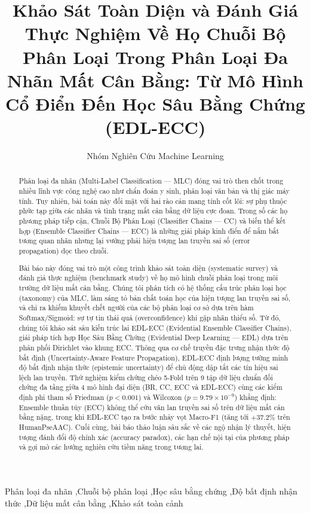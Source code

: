 \documentclass[1p,times]{elsarticle}
\begin{document}
\begin{frontmatter}

\title{Khảo Sát Toàn Diện và Đánh Giá Thực Nghiệm Về Họ Chuỗi Bộ Phân Loại Trong Phân Loại Đa Nhãn Mất Cân Bằng: Từ Mô Hình Cổ Điển Đến Học Sâu Bằng Chứng (EDL-ECC)}

\author{Nhóm Nghiên Cứu Machine Learning}
\address{Phòng Thí Nghiệm Trí Tuệ Nhân Tạo và Khoa Học Dữ Liệu}

\begin{abstract}
Phân loại đa nhãn (Multi-Label Classification — MLC) đóng vai trò then chốt trong nhiều lĩnh vực công nghệ cao như chẩn đoán y sinh, phân loại văn bản và thị giác máy tính. Tuy nhiên, bài toán này đối mặt với hai rào cản mang tính cốt lõi: sự phụ thuộc phức tạp giữa các nhãn và tình trạng mất cân bằng dữ liệu cực đoan. Trong số các họ phương pháp tiếp cận, Chuỗi Bộ Phân Loại (Classifier Chains — CC) và biến thể kết hợp (Ensemble Classifier Chains — ECC) là những giải pháp kinh điển để nắm bắt tương quan nhãn nhưng lại vướng phải hiện tượng lan truyền sai số (error propagation) dọc theo chuỗi. 

Bài báo này đóng vai trò một công trình khảo sát toàn diện (systematic survey) và đánh giá thực nghiệm (benchmark study) về họ mô hình chuỗi phân loại trong môi trường dữ liệu mất cân bằng. Chúng tôi phân tích có hệ thống cấu trúc phân loại học (taxonomy) của MLC, làm sáng tỏ bản chất toán học của hiện tượng lan truyền sai số, và chỉ ra khiếm khuyết chết người của các bộ phân loại cơ sở dựa trên hàm Softmax/Sigmoid: sự tự tin thái quá (overconfidence) khi gặp nhãn thiểu số. Từ đó, chúng tôi khảo sát sâu kiến trúc lai EDL-ECC (Evidential Ensemble Classifier Chains), giải pháp tích hợp Học Sâu Bằng Chứng (Evidential Deep Learning — EDL) dựa trên phân phối Dirichlet vào khung ECC. Thông qua cơ chế truyền đặc trưng nhận thức độ bất định (Uncertainty-Aware Feature Propagation), EDL-ECC định lượng tường minh độ bất định nhận thức (epistemic uncertainty) để chủ động dập tắt các tín hiệu sai lệch lan truyền. Thử nghiệm kiểm chứng chéo 5-Fold trên 9 tập dữ liệu chuẩn đối chứng đa tầng giữa 4 mô hình đại diện (BR, CC, ECC và EDL-ECC) cùng các kiểm định phi tham số Friedman ($p < 0.001$) và Wilcoxon ($p = 9.79 \times 10^{-9}$) khẳng định: Ensemble thuần túy (ECC) không thể cứu vãn lan truyền sai số trên dữ liệu mất cân bằng nặng, trong khi EDL-ECC tạo ra bước nhảy vọt Macro-F1 (tăng tới $+37.2\%$ trên HumanPseAAC). Cuối cùng, bài báo thảo luận sâu sắc về các ngộ nhận lý thuyết, hiện tượng đánh đổi độ chính xác (accuracy paradox), các hạn chế nội tại của phương pháp và gợi mở các hướng nghiên cứu tiềm năng trong tương lai.
\end{abstract}

\begin{keyword}
Phân loại đa nhãn \sep Chuỗi bộ phân loại \sep Học sâu bằng chứng \sep Độ bất định nhận thức \sep Dữ liệu mất cân bằng \sep Khảo sát toàn cảnh
\end{keyword}

\end{frontmatter}
\end{document}
